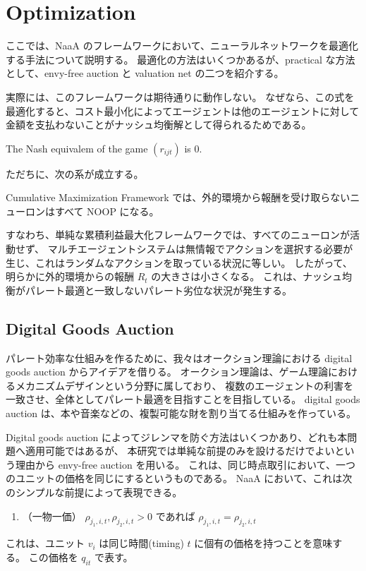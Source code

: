 \section{Optimization}
ここでは、NaaA のフレームワークにおいて、ニューラルネットワークを最適化する手法について説明する。
最適化の方法はいくつかあるが、practical な方法として、envy-free auction と valuation net の二つを紹介する。

実際には、このフレームワークは期待通りに動作しない。
なぜなら、この式を最適化すると、コスト最小化によってエージェントは他のエージェントに対して金額を支払わないことがナッシュ均衡解として得られるためである。

\begin{thm}\label{thm:optimal-bidding-simple}
	The Nash equivalem of the game $(r_{ijt})$ is $0$.
\end{thm}
ただちに、次の系が成立する。
\begin{coro}\label{coro:optimal-bidding-simple}
	Cumulative Maximization Framework では、外的環境から報酬を受け取らないニューロンはすべて NOOP になる。
\end{coro}

すなわち、単純な累積利益最大化フレームワークでは、すべてのニューロンが活動せず、
マルチエージェントシステムは無情報でアクションを選択する必要が生じ、これはランダムなアクションを取っている状況に等しい。
したがって、明らかに外的環境からの報酬 $R_t$ の大きさは小さくなる。
これは、ナッシュ均衡がパレート最適と一致しないパレート劣位な状況が発生する。

\subsection{Digital Goods Auction}
パレート効率な仕組みを作るために、我々はオークション理論における digital goods auction からアイデアを借りる。
オークション理論は、ゲーム理論におけるメカニズムデザインという分野に属しており、
複数のエージェントの利害を一致させ、全体としてパレート最適を目指すことを目指している。
digital goods auction は、本や音楽などの、複製可能な財を割り当てる仕組みを作っている。

Digital goods auction によってジレンマを防ぐ方法はいくつかあり、どれも本問題へ適用可能ではあるが、
本研究では単純な前提のみを設けるだけでよいという理由から envy-free auction \cite{} を用いる。
これは、同じ時点取引において、一つのユニットの価格を同じにするというものである。
NaaA において、これは次のシンプルな前提によって表現できる。
\begin{enumerate}
\renewcommand{\labelenumi}{N\arabic{enumi}:}
\setcounter{enumi}{4}
\item （一物一価）
	$\rho_{j_1,i,t}, \rho_{j_2,i,t} > 0$ であれば $\rho_{j_1,i,t} = \rho_{j_2,i,t}$ 
\end{enumerate}
これは、ユニット $v_i$ は同じ時間(timing) $t$ に個有の価格を持つことを意味する。
この価格を $q_{it}$ で表す。


